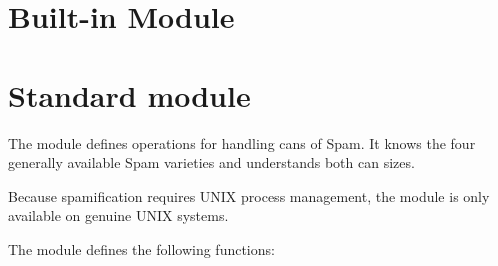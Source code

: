 


\section{Built-in Module }	%

\section{Standard module }	%



The  module defines operations for handling cans of Spam.
It knows the four generally available Spam varieties and understands
both can sizes.

Because spamification requires UNIX process management, the module is
only available on genuine UNIX systems.



The  module defines the following functions:


\renewcommand{\indexsubitem}{(in module spam)}


